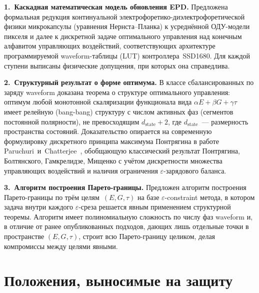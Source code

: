 \textbf{1.~Каскадная математическая модель обновления EPD.} Предложена
формальная редукция континуальной электрофоретико-диэлектрофоретической
физики микрокапсулы (уравнения Нернста\nobreakdash--Планка) к усреднённой
ОДУ-модели пикселя и далее к дискретной задаче оптимального управления над
конечным алфавитом управляющих воздействий, соответствующих архитектуре
программируемой waveform-таблицы (LUT) контроллера~SSD1680. Для каждой ступени
выписаны физические допущения, при которых она справедлива.

\textbf{2.~Структурный результат о форме оптимума.} В классе сбалансированных
по заряду
waveform доказана теорема о структуре оптимального управления: оптимум любой
монотонной скаляризации функционала вида $\alpha E + \beta G + \gamma \tau$
имеет релейную (bang-bang) структуру с числом активных фаз (сегментов
постоянной полярности), не превосходящим $d_{\mathrm{state}} + 2$, где
$d_{\mathrm{state}}$~--- размерность пространства состояний. Доказательство
опирается на современную формулировку дискретного принципа максимума
Понтрягина в работе
Paruchuri~и~Chatterjee~\cite{paruchuri2019_discrete_pmp}, обобщающую
классический результат Понтрягина, Болтянского, Гамкрелидзе, Мищенко
\cite{pontryagin1983_optimal_processes} с учётом дискретности множества
управляющих воздействий и наличия ограничения $\varepsilon$-зарядового
баланса.

\textbf{3.~Алгоритм построения Парето-границы.} Предложен алгоритм построения
Парето-границы по трём целям~$(E, G, \tau)$ на базе $\varepsilon$-constraint
метода, в котором задача внутри каждого $\varepsilon$-среза решается явным
применением структурной теоремы. Алгоритм имеет полиномиальную сложность по
числу фаз waveform и, в отличие от ранее опубликованных подходов,
дающих лишь отдельные точки в пространстве $(E, G, \tau)$, строит всю
Парето-границу целиком, делая компромиссы между целями явными.


\section*{Положения, выносимые на защиту}

